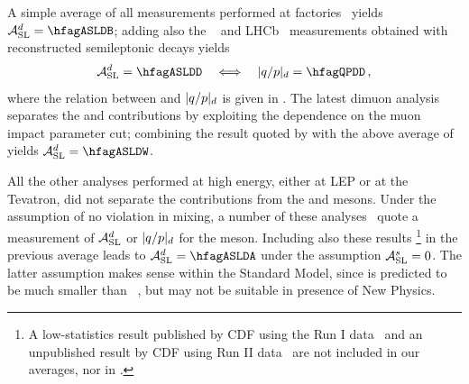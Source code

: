 A simple average of all measurements performed at 
\B factories~\cite{Behrens:2000qu,Jaffe:2001hz,*Jaffe:2001hz_cont,Aubert:2003hd,*Aubert:2004xga_mod_cont,Aubert:2006nf,*Aubert:2002mn_mod_cont,Lees:2013sua,*Margoni:2013qx,*Aubert:2006sa_mod,Nakano:2005jb}
yields $\ASLd = \hfagASLDB$; adding also the \dzero~\cite{Abazov:2012uia}
and LHCb~\cite{Aaij:2014nxa} measurements obtained with reconstructed 
semileptonic \Bd decays yields
\begin{equation}
\ASLd = \hfagASLDD  ~~~ \Longleftrightarrow ~~~ |q/p|_{\particle{d}} = \hfagQPDD \,,
\labe{ASLDD}
\end{equation}
where the relation between \ASLd and $|q/p|_{d}$ is given in .
The latest dimuon \dzero analysis~\cite{Abazov:2013uma,*Abazov:2011yk_mod,*Abazov:2010hv_mod_cont,*Abazov:2010hj_mod_cont,*Abazov:2011yk_cont}
separates the \Bd and \Bs contributions by exploiting the dependence on the muon impact parameter cut; combining the 
\ASLd result quoted by \dzero with the above \Bd average of  yields
$\ASLd = \hfagASLDW$. %

All the other \Bd analyses performed at high energy, either at LEP or at the Tevatron,
did not separate the contributions from the \Bd and \Bs mesons.
Under the assumption of no \CP violation in \Bs mixing, a number of 
these analyses~\cite{Abazov:2006qw,Ackerstaff:1997vd,Barate:2000uk,Abbiendi:1998av}
quote a measurement of ${\cal A}_{\rm SL}^d$ or $|q/p|_{d}$ for the \Bd meson. Including also 
these results%
\footnote{
  \label{foot:life_mix:Abe:1996zt}
  A low-statistics result published by CDF using the Run I data~\cite{Abe:1996zt} and 
an unpublished result by CDF using Run II data~\cite{CDFnote9015:2007} 
are not included in our averages, nor in .}
in the previous average %
leads to 
$\ASLd = \hfagASLDA$ %
under the assumption ${\cal A}_{\rm SL}^s =0$. The latter assumption makes sense within the Standard Model, 
since \ASLs is predicted to be much smaller than \ASLd~\cite{Lenz:2011ti,*Lenz:2006hd}, but may not be suitable
in presence of New Physics. 

